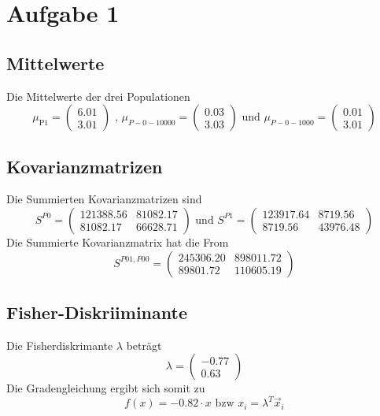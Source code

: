 \section*{Aufgabe 1}
\subsection*{Mittelwerte}

Die Mittelwerte der drei Populationen
\begin{equation}
  \mu_\text{P1} = \begin{pmatrix} 6.01 \\ 3.01 \end{pmatrix} \text{ , } \mu_{P-0-10000} = \begin{pmatrix} 0.03 \\ 3.03 \end{pmatrix} \text{ und } \mu_{P-0-1000} = \begin{pmatrix} 0.01 \\ 3.01 \end{pmatrix}
\end{equation}
\subsection*{Kovarianzmatrizen}
Die Summierten Kovarianzmatrizen sind
\begin{equation}
  S^{P0} = \begin{pmatrix} 121388.56 & 81082.17 \\ 81082.17 & 66628.71 \end{pmatrix} \text{ und } S^{P1} = \begin{pmatrix} 123917.64 & 8719.56 \\ 8719.56 & 43976.48 \end{pmatrix}
\end{equation}
Die Summierte Kovarianzmatrix hat die From
\begin{equation}
  S^{P01,P00} = \begin{pmatrix} 245306.20 & 898011.72 \\ 89801.72 & 110605.19 \end{pmatrix}
\end{equation}
\subsection*{Fisher-Diskriiminante}
Die Fisherdiskrimante $\lambda$ beträgt
\begin{equation}
  \lambda = \begin{pmatrix} -0.77 \\ 0.63 \end{pmatrix}
\end{equation}
Die Gradengleichung ergibt sich somit zu
\begin{equation}
  f(x) = -0.82 \cdot x \text{    bzw    } x_i = \lambda^T \vec{x}_i
\end{equation}
